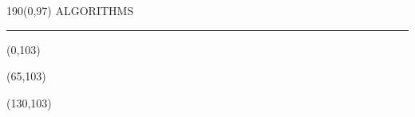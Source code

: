 \begin{textblock}{190}(0,97)
\sffamily\normalsize{\color{sciorange}ALGORITHMS}\small\\
\rule[3mm]{190mm}{0.1pt}
\end{textblock}

\begin{textblock}{60}(0,103)
    
\end{textblock}

\begin{textblock}{60}(65,103)
    
\end{textblock}

\begin{textblock}{60}(130,103)
    
\end{textblock}
